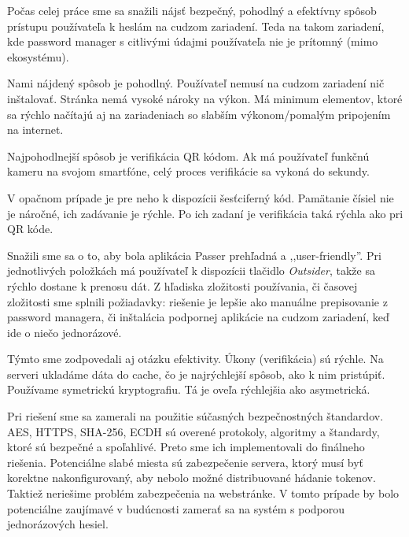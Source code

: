 \indent Počas celej práce sme sa snažili nájsť bezpečný, pohodlný a efektívny spôsob prístupu používateľa k heslám na cudzom zariadení. Teda na takom zariadení, kde password manager s citlivými údajmi používateľa nie je prítomný (mimo ekosystému).

Nami nájdený spôsob je pohodlný. Používateľ nemusí na cudzom zariadení nič inštalovať. Stránka nemá vysoké nároky na výkon. Má minimum elementov, ktoré sa rýchlo načítajú aj na zariadeniach so slabším výkonom/pomalým pripojením na internet. 

Najpohodlnejší spôsob je verifikácia QR kódom. Ak má používateľ funkčnú kameru na svojom smartfóne, celý proces verifikácie sa vykoná do sekundy.

V opačnom prípade je pre neho k dispozícii šesťciferný kód. Pamätanie čísiel nie je náročné, ich zadávanie je rýchle. Po ich zadaní je verifikácia taká rýchla ako pri QR kóde. 

Snažili sme sa o to, aby bola aplikácia Passer prehľadná a ,,user-friendly''. Pri jednotlivých položkách má používateľ k dispozícii tlačidlo \textit{Outsider}, takže sa rýchlo dostane k prenosu dát. Z hľadiska zložitosti používania, či časovej zložitosti sme splnili požiadavky: riešenie je lepšie ako manuálne prepisovanie z password managera, či inštalácia podpornej aplikácie na cudzom zariadení, keď ide o niečo jednorázové.

Týmto sme zodpovedali aj otázku efektivity. Úkony (verifikácia) sú rýchle. Na serveri ukladáme dáta do cache, čo je najrýchlejší spôsob, ako k nim pristúpiť. Používame symetrickú kryptografiu. Tá je oveľa rýchlejšia ako asymetrická. 

Pri riešení sme sa zamerali na použitie súčasných bezpečnostných štandardov. AES, HTTPS, SHA-256, ECDH sú overené protokoly, algoritmy a štandardy, ktoré sú bezpečné a spoľahlivé. Preto sme ich implementovali do finálneho riešenia. Potenciálne slabé miesta sú zabezpečenie servera, ktorý musí byť korektne nakonfigurovaný, aby nebolo možné distribuované hádanie tokenov. Taktiež neriešime problém zabezpečenia na webstránke. V tomto prípade by bolo potenciálne zaujímavé v budúcnosti zamerať sa na systém s podporou jednorázových hesiel. 